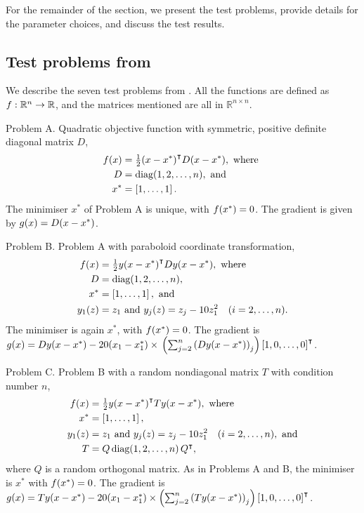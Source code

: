 \documentclass[main.tex]{subfiles}
\begin{document}
For the remainder of the section, we present the test problems,
provide details for the parameter choices, and discuss the test
results.

\subsection{Test problems from \citeauthor{sterck2013steepest}}\label{subsec:test_problems_sterck}
We describe the seven test problems from \citet{sterck2013steepest}.
All the functions are defined as $f:\mathbb{R}^n\to\mathbb{R}$, and
the matrices mentioned are all in $\mathbb{R}^{n\times n}$.

Problem A. Quadratic objective function with symmetric, positive
definite diagonal matrix $D$,
\begin{align}
  \begin{split}
    f(x)&= {\textstyle\frac{1}{2}}{(x-x^*)}^\intercal D(x-x^*),\text{ where }\\
    D&=\mbox{diag}(1,2,\dots,n), \text{ and }\\
    x^*&=\left[1,\dots,1\right].
  \end{split}
\end{align}
The minimiser $x^*$ of Problem A is unique, with $f(x^*)=0$. The
gradient is given by $g(x)=D(x-x^*)$.

Problem B. Problem A with paraboloid coordinate transformation,
\begin{align}
  \begin{split}
    f(x)&= {\textstyle\frac{1}{2}}{y(x-x^*)}^\intercal Dy(x-x^*),\text{ where }\\
    D&=\mbox{diag}(1,2,\dots,n),\\
    x^*&=\left[1,\dots,1\right], \text{ and }\\
    y_1(z)&=z_1 \text{ and } y_j(z)=z_j-10z_1^2 \quad (i=2,\dots,n).
  \end{split}
\end{align}
The minimiser is again $x^*$, with $f(x^*)=0$. The gradient is
$\Grad(x) = Dy(x-x^*) - 20(x_1-x_1^*) \times\newline \left(
  \sum_{j=2}^n{(Dy(x-x^*))}_j \right)
\Transpose{\vecbracks{1,0,\dots,0}}$.

Problem C. Problem B with a random nondiagonal matrix $T$ with
condition number $n$,
\begin{align}
  \begin{split}
    f(x)&={\textstyle\frac{1}{2}}{y(x-x^*)}^\intercal Ty(x-x^*),\text{ where }\\
    x^*&=\left[1,\dots,1\right],\\
    y_1(z)&=z_1 \text{ and } y_j(z)=z_j-10z_1^2 \quad (i=2,\dots,n),
    \text { and}\\
    T&=Q\,\mbox{diag}(1,2,\dots,n)\,Q^\intercal,
  \end{split}
\end{align}
where $Q$ is a random orthogonal matrix.  As in Problems A and B, the
minimiser is $x^*$ with $f(x^*)=0$. The gradient is
$g(x) = Ty(x-x^*) - 20(x_1-x_1^*) \times \left(
  \sum_{j=2}^n{(Ty(x-x^*))}_j \right)
\left[1,0,\dots,0\right]^\intercal$.
\end{document}
